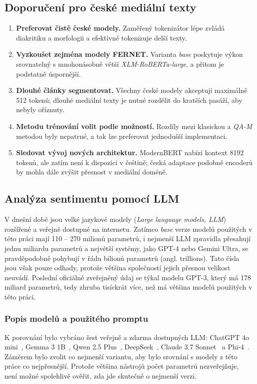 \subsection{Doporučení pro české mediální texty}
\begin{enumerate}
  \item \textbf{Preferovat čistě české modely.}
        Zaměřený tokenizátor lépe zvládá diakritiku a morfologii a efektivně tokenizuje delší texty.
  \item \textbf{Vyzkoušet zejména modely FERNET.}
        Varianta \emph{base} poskytuje výkon srovnatelný s mnohonásobně větší \emph{XLM-RoBERTa-large}, a přitom je podstatně úspornější.
  \item \textbf{Dlouhé články segmentovat.}
        Všechny české modely akceptují maximálně 512 tokenů; dlouhé mediální texty je nutné rozdělit do kratších pasáží, aby nebyly oříznuty.
  \item \textbf{Metodu trénování volit podle možností.}
        Rozdíly mezi klasickou a \emph{QA-M} metodou byly nepatrné, a tak lze preferovat jednodušší implementaci.
  \item \textbf{Sledovat vývoj nových architektur.}
        ModernBERT nabízí kontext 8192 tokenů, ale zatím není k dispozici v češtině; česká adaptace podobně  encoderů by mohla dále zvýšit přesnost v mediální doméně.
\end{enumerate}

\subsection{Analýza sentimentu pomocí LLM}
V dnešní době jsou velké jazykové modely (\emph{Large language models, LLM}) rozšířené a veřejně dostupné na internetu. Zatímco \emph{base} verze modelů použitých v této práci mají 110 -- 270 milionů parametrů, i nejmenší LLM zpravidla přesahují jednu miliardu parametrů a největší systémy, jako GPT-4 nebo Gemini Ultra, se pravděpodobně pohybují v řádu bilionů parametrů (angl. trillions). Tato čísla jsou však pouze odhady, protože většina společností jejich přesnou velikost neuvádí. Poslední oficiálně zveřejněný údaj se týkal modelu GPT-3, který má 178 miliard parametrů, tedy zhruba tisíckrát více, než má většina modelů použitých v této práci.~\cite{Joshparameters}

\subsubsection{Popis modelů a použitého promptu}
K porovnání bylo vybráno šest veřejně a zdarma dostupných LLM: ChatGPT 4o mini~\cite{ChatGPT}, Gemma 3 1B~\cite{Gemini2}, Qwen 2.5 Plus~\cite{Qwen}, DeepSeek~\cite{Deepseek}, Claude 3.7 Sonnet~\cite{Claude} a Phi‑4~\cite{phi4}. Záměrem bylo zvolit co nejmenší variantu, aby bylo srovnání s modely z této práce co nejpřesnější. Protože většina nástrojů počet parametrů nezveřejňuje, není možné spolehlivě ověřit, zda jde skutečně o nejmenší verzi.

